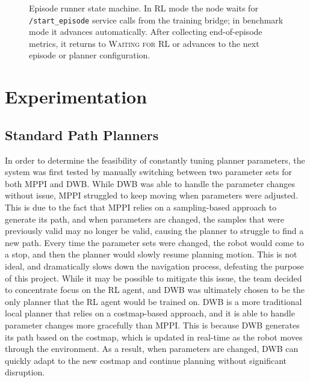 \documentclass[conference]{IEEEtran}
\begin{document}
\begin{figure}[H]
{%
        }
        \caption{Episode runner state machine. In RL mode the node waits for \texttt{/start\_episode} service calls from the training bridge; in benchmark mode it advances automatically. After collecting end-of-episode metrics, it returns to \textsc{Waiting for RL} or advances to the next episode or planner configuration.}
        \label{fig:episode_runner}
        \end{figure}

\section{Experimentation}
    \subsection{Standard Path Planners}
    In order to determine the feasibility of constantly tuning planner parameters, the system was first tested by manually switching between two
    parameter sets for both MPPI and DWB. While DWB was able to handle the parameter changes without issue, MPPI struggled to keep moving when
    parameters were adjusted. This is due to the fact that MPPI relies on a sampling-based approach to generate its path, and when parameters are
    changed, the samples that were previously valid may no longer be valid, causing the planner to struggle to find a new path. Every time the
    parameter sets were changed, the robot would come to a stop, and then the planner would slowly resume planning motion. This is not ideal, and
    dramatically slows down the navigation process, defeating the purpose of this project. While it may be possible to mitigate this issue, the team
    decided to concentrate focus on the RL agent, and DWB was ultimately chosen to be the only planner that the RL agent would be trained on. DWB
    is a more traditional local planner that relies on a costmap-based approach, and it is able to handle parameter changes more gracefully than MPPI.
    This is because DWB generates its path based on the costmap, which is updated in real-time as the robot moves through the environment. As a
    result, when parameters are changed, DWB can quickly adapt to the new costmap and continue planning without significant disruption.
    
\end{document}

